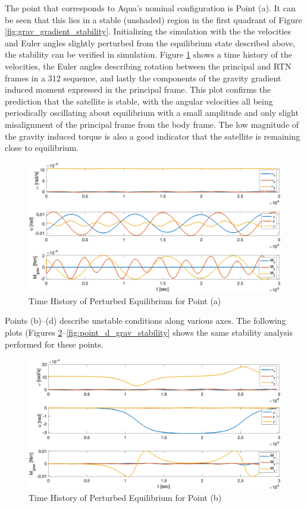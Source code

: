 The point that corresponds to Aqua's nominal configuration is Point (a). It can be seen that this lies in a stable (unshaded) region in the first quadrant of Figure \ref{fig:grav_gradient_stability}. Initializing the simulation with the the velocities and Euler angles slightly perturbed from the equilibrium state described above, the stability can be verified in simulation. Figure \ref{fig:point_a_grav_stability} shows a time history of the velocities, the Euler angles describing rotation between the principal and RTN frames in a 312 sequence, and lastly the components of the gravity gradient induced moment expressed in the principal frame. This plot confirms the prediction that the satellite is stable, with the angular velocities all being periodically oscillating about equilibrium with a small amplitude and only slight misalignment of the principal frame from the body frame. The low magnitude of the gravity induced torque is also a good indicator that the satellite is remaining close to equilibrium.

\begin{figure}[H]
    \centering
    \captionsetup{justification = centering}
    \includegraphics[width = 12cm]{Images/PS5/point_a_grav_stability.png}
    \caption{Time History of Perturbed Equilibrium for Point (a)}
    \label{fig:point_a_grav_stability}
\end{figure}

Points (b)--(d) describe unstable conditions along various axes. The following plots (Figures \ref{fig:point_b_grav_stability}--\ref{fig:point_d_grav_stability} shows the same stability analysis performed for these points.

\begin{figure}[H]
    \centering
    \captionsetup{justification = centering}
    \includegraphics[width = 12cm]{Images/PS5/point_b_grav_stability.png}
    \caption{Time History of Perturbed Equilibrium for Point (b)}
    \label{fig:point_b_grav_stability}
\end{figure}

